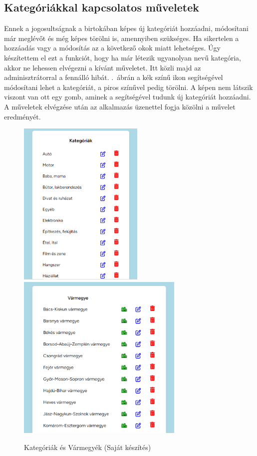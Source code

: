 \documentclass[]{thesis-ekf}
\theoremstyle{definition}
\theoremstyle{remark}
\begin{document}
	\subsection{Kategóriákkal kapcsolatos műveletek}\label{sc-kategoria}
		Ennek a jogosultságnak a birtokában képes új kategóriát hozzáadni, módosítani már meglévőt és még képes törölni is, amennyiben szükséges. Ha sikertelen a hozzáadás vagy a módosítás az a következő okok miatt lehetséges. Úgy készítettem el ezt a funkciót, hogy ha már létezik ugyanolyan nevű kategória, akkor ne lehessen elvégezni a kívánt műveletet. Itt közli majd az adminisztrátorral a fennálló hibát. .~ábrán a kék színű ikon segítségével módosítani lehet a kategóriát, a piros színűvel pedig törölni. A képen nem látszik viszont van ott egy gomb, aminek a segítségével tudunk új kategóriát hozzáadni. A műveletek elvégzése után az alkalmazás üzenettel fogja közölni a művelet eredményét.
		\begin{figure}[ht!]
			\centering
			\includegraphics[height=8cm]{./felhasznaloi/kategoria}
			\includegraphics[height=8cm]{./felhasznaloi/varmegye}
			\caption{Kategóriák és Vármegyék (Saját készítés)} 
			\label{kategoria-muveletek}
			\label{varmegye-varos-muvelet}
		\end{figure} 
\end{document}
